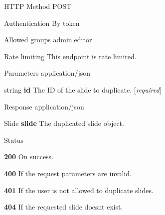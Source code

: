 \begin{DoxyParagraph}{H\+T\+TP Method}
P\+O\+ST 
\end{DoxyParagraph}
\begin{DoxyParagraph}{Authentication}
By token 
\end{DoxyParagraph}
\begin{DoxyParagraph}{Allowed groups}
{\ttfamily admin$\vert$editor} 
\end{DoxyParagraph}
\begin{DoxyParagraph}{Rate limiting}
This endpoint is rate limited.
\end{DoxyParagraph}
\begin{DoxyParagraph}{Parameters}
application/json
\begin{DoxyItemize}
\item {\ttfamily string} {\bfseries id} The ID of the slide to duplicate. \mbox{[}{\itshape required}\mbox{]}
\end{DoxyItemize}
\end{DoxyParagraph}
\begin{DoxyParagraph}{Response}
application/json
\begin{DoxyItemize}
\item {\ttfamily Slide} {\bfseries slide} The duplicated slide object.
\end{DoxyItemize}
\end{DoxyParagraph}
\begin{DoxyParagraph}{Status}

\begin{DoxyItemize}
\item {\bfseries 200} On success.
\item {\bfseries 400} If the request parameters are invalid.
\item {\bfseries 401} If the user is not allowed to duplicate slides.
\item {\bfseries 404} If the requested slide doesn\textquotesingle{}t exist. 
\end{DoxyItemize}
\end{DoxyParagraph}
